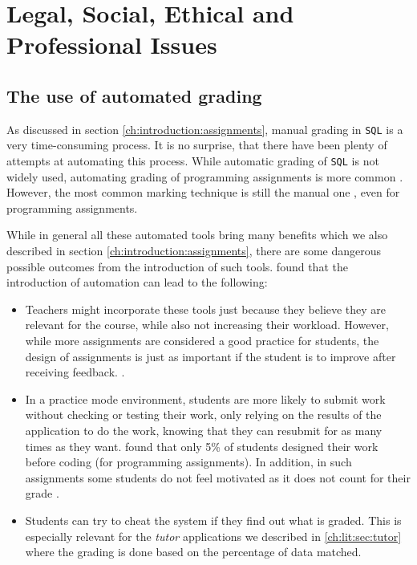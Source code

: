 \chapter{Legal, Social, Ethical and Professional Issues}

\section{The use of automated grading}

As discussed in section \ref{ch:introduction:assignments}, manual grading in \texttt{SQL} is a very time-consuming process. It is no surprise, that there have been plenty of attempts at automating this process. While automatic grading of \texttt{SQL} is not widely used, automating grading of programming assignments is more common \citep{literature:assesment:automated:survey}. However, the most common marking technique is still the manual one \citep{literature:assesment:automated:survey}, even for programming assignments.

While in general all these automated tools bring many benefits which we also described in section \ref{ch:introduction:assignments}, there are some dangerous possible outcomes from the introduction of such tools. \cite{literature:assesment:automated:survey} found that the introduction of automation can lead to the following:
\begin{itemize}
    \item Teachers might incorporate these tools just because they believe they are relevant for the course, while also not increasing their workload. However, while more assignments are considered a good practice for students, the design of assignments is just as important if the student is to improve after receiving feedback. \citep{literature:assesment:automated:survey, literature:assement}.
    \item In a practice mode environment, students are more likely to submit work without checking or testing their work, only relying on the results of the application to do the work, knowing that they can resubmit for as many times as they want. \cite{literature:assesment:automated:survey} found that only 5\% of students designed their work before coding (for programming assignments). In addition, in such assignments some students do not feel motivated as it does not count for their grade \citep{literature:activesql}.
    \item Students can try to cheat the system if they find out what is graded. This is especially relevant for the \textit{tutor} applications we described in \ref{ch:lit:sec:tutor} where the grading is done based on the percentage of data matched.
\end{itemize}

